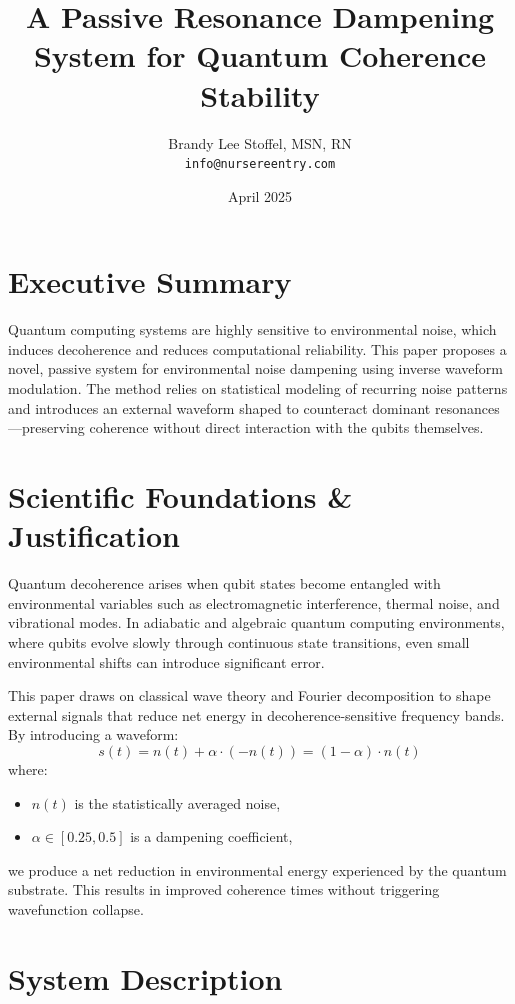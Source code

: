 \documentclass[12pt]{article}
\title{A Passive Resonance Dampening System for Quantum Coherence Stability}
\author{Brandy Lee Stoffel, MSN, RN \\ \small \texttt{info@nursereentry.com}}
\date{April 2025}
\begin{document}
\maketitle

\section*{Executive Summary}
Quantum computing systems are highly sensitive to environmental noise, which induces decoherence and reduces computational reliability. This paper proposes a novel, passive system for environmental noise dampening using inverse waveform modulation. The method relies on statistical modeling of recurring noise patterns and introduces an external waveform shaped to counteract dominant resonances---preserving coherence without direct interaction with the qubits themselves.

\section*{Scientific Foundations \& Justification}
Quantum decoherence arises when qubit states become entangled with environmental variables such as electromagnetic interference, thermal noise, and vibrational modes. In adiabatic and algebraic quantum computing environments, where qubits evolve slowly through continuous state transitions, even small environmental shifts can introduce significant error.

This paper draws on classical wave theory and Fourier decomposition to shape external signals that reduce net energy in decoherence-sensitive frequency bands. By introducing a waveform:
\[
s(t) = n(t) + \alpha \cdot (-n(t)) = (1 - \alpha) \cdot n(t)
\]
where:
\begin{itemize}
  \item $n(t)$ is the statistically averaged noise,
  \item $\alpha \in [0.25, 0.5]$ is a dampening coefficient,
\end{itemize}

we produce a net reduction in environmental energy experienced by the quantum substrate. This results in improved coherence times without triggering wavefunction collapse.

\section*{System Description}
\end{document}
